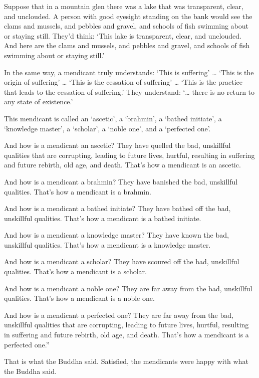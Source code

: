 \documentclass[12pt,openany]{book}%
\begin{document}
Suppose that in a mountain glen there was a lake that was transparent, clear, and unclouded. A person with good eyesight standing on the bank would see the clams and mussels, and pebbles and gravel, and schools of fish swimming about or staying still. They’d think: ‘This lake is transparent, clear, and unclouded. And here are the clams and mussels, and pebbles and gravel, and schools of fish swimming about or staying still.’ 

In the same way, a mendicant truly understands: ‘This is suffering’ … ‘This is the origin of suffering’ … ‘This is the cessation of suffering’ … ‘This is the practice that leads to the cessation of suffering.’ They understand: ‘… there is no return to any state of existence.’ 

This mendicant is called an ‘ascetic’, a ‘brahmin’, a ‘bathed initiate’, a ‘knowledge master’, a ‘scholar’, a ‘noble one’, and a ‘perfected one’. 

And how is a mendicant an ascetic? They have quelled the bad, unskillful qualities that are corrupting, leading to future lives, hurtful, resulting in suffering and future rebirth, old age, and death. That’s how a mendicant is an ascetic. 

And how is a mendicant a brahmin? They have banished the bad, unskillful qualities. That’s how a mendicant is a brahmin. 

And how is a mendicant a bathed initiate? They have bathed off the bad, unskillful qualities. That’s how a mendicant is a bathed initiate. 

And how is a mendicant a knowledge master? They have known the bad, unskillful qualities. That’s how a mendicant is a knowledge master. 

And how is a mendicant a scholar? They have scoured off the bad, unskillful qualities. That’s how a mendicant is a scholar. 

And how is a mendicant a noble one? They are far away from the bad, unskillful qualities. That’s how a mendicant is a noble one. 

And how is a mendicant a perfected one? They are far away from the bad, unskillful qualities that are corrupting, leading to future lives, hurtful, resulting in suffering and future rebirth, old age, and death. That’s how a mendicant is a perfected one.” 

That is what the Buddha said. Satisfied, the mendicants were happy with what the Buddha said. 
\end{document}
